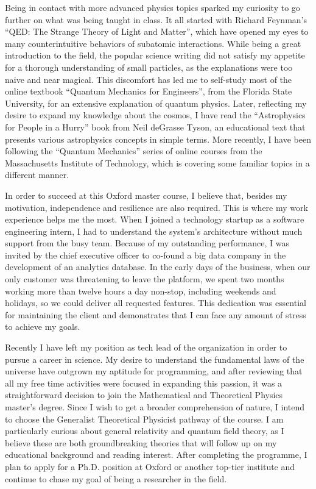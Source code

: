\documentclass[10pt]{article}
\newcommand*{\NEWLINE}{\vspace{0.75em}}
\begin{document}
Being in contact with more advanced physics topics sparked my curiosity to go further on what was being taught in class. It all started with Richard Feynman's ``QED: The Strange Theory of Light and Matter'', which have opened my eyes to many counterintuitive behaviors of subatomic interactions. While being a great introduction to the field, the popular science writing did not satisfy my appetite for a thorough understanding of small particles, as the explanations were too naive and near magical. This discomfort has led me to self-study most of the online textbook ``Quantum Mechanics for Engineers'', from the Florida State University, for an extensive explanation of quantum physics. Later, reflecting my desire to expand my knowledge about the cosmos, I have read the ``Astrophysics for People in a Hurry'' book from Neil deGrasse Tyson, an educational text that presents various astrophysics concepts in simple terms. More recently, I have been following the ``Quantum Mechanics'' series of online courses from the Massachusetts Institute of Technology, which is covering some familiar topics in a different manner.
\NEWLINE{}

In order to succeed at this Oxford master course, I believe that, besides my motivation, independence and resilience are also required. This is where my work experience helps me the most. When I joined a technology startup as a software engineering intern, I had to understand the system's architecture without much support from the busy team. Because of my outstanding performance, I was invited by the chief executive officer to co-found a big data company in the development of an analytics database. In the early days of the business, when our only customer was threatening to leave the platform, we spent two months working more than twelve hours a day non-stop, including weekends and holidays, so we could deliver all requested features. This dedication was essential for maintaining the client and demonstrates that I can face any amount of stress to achieve my goals. \NEWLINE{}

Recently I have left my position as tech lead of the organization in order to pursue a career in science. My desire to understand the fundamental laws of the universe have outgrown my aptitude for programming, and after reviewing that all my free time activities were focused in expanding this passion, it was a straightforward decision to join the Mathematical and Theoretical Physics master's degree. Since I wish to get a broader comprehension of nature, I intend to choose the Generalist Theoretical Physicist pathway of the course. I am particularly curious about general relativity and quantum field theory, as I believe these are both groundbreaking theories that will follow up on my educational background and reading interest. After completing the programme, I plan to apply for a Ph.D. position at Oxford or another top-tier institute and continue to chase my goal of being a researcher in the field.
\end{document}
